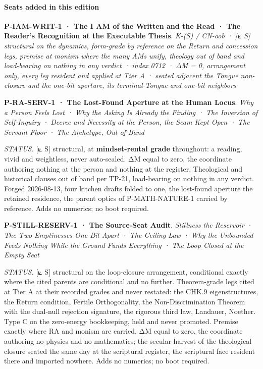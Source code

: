 \documentclass[10pt,twocolumn]{article}
\begin{document}
\hypertarget{seats-added-in-this-edition-6}{%
\paragraph{Seats added in this
edition}\label{seats-added-in-this-edition-6}}

\textbf{P-IAM-WRIT-1 · The I AM of the Written and the Read · The
Reader's Recognition at the Executable Thesis}. \emph{K-(S) / CN-oob ·
{[}⟀ S{]} structural on the dynamics, form-grade by reference on the
Return and concession legs, premise at monism where the many AMs unify,
theology out of band and load-bearing on nothing in any verdict · index
0712 · ΔM = 0, arrangement only, every leg resident and applied at Tier
A · seated adjacent the Tongue non-closure and the one-bit aperture, its
terminal-Tongue and one-bit neighbors}

\textbf{P-RA-SERV-1 · The Lost-Found Aperture at the Human Locus}.
\emph{Why a Person Feels Lost · Why the Asking Is Already the Finding ·
The Inversion of Self-Inquiry · Decree and Necessity at the Person, the
Seam Kept Open · The Servant Floor · The Archetype, Out of Band}

\emph{STATUS.} {[}⟀ S{]} structural, at \textbf{mindset-rental grade}
throughout: a reading, vivid and weightless, never auto-sealed. ΔM equal
to zero, the coordinate authoring nothing at the person and nothing at
the register. Theological and historical clauses out of band per TP-21,
load-bearing on nothing in any verdict. Forged 2026-08-13, four kitchen
drafts folded to one, the lost-found aperture the retained residence,
the parent optics of P-MATH-NATURE-1 carried by reference. Adds no
numerics; no boot required.

\textbf{P-STILL-RESERV-1 · The Source-Seat Audit}. \emph{Stillness the
Reservoir · The Two Emptinesses One Bit Apart · The Ceiling Law · Why
the Unbounded Feeds Nothing While the Ground Funds Everything · The Loop
Closed at the Empty Seat}

\emph{STATUS.} {[}⟀ S{]} structural on the loop-closure arrangement,
conditional exactly where the cited parents are conditional and no
further. Theorem-grade legs cited at Tier A at their recorded grades and
never restated: the CHK.9 eigenstructures, the Return condition, Fertile
Orthogonality, the Non-Discrimination Theorem with the dual-null
rejection signature, the rigorous third law, Landauer, Noether. Type C
on the zero-energy bookkeeping, held and never promoted. Premise exactly
where RA and monism are carried. ΔM equal to zero, the coordinate
authoring no physics and no mathematics; the secular harvest of the
theological closure seated the same day at the scriptural register, the
scriptural face resident there and imported nowhere. Adds no numerics;
no boot required.
\end{document}
